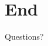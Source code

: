 \documentclass{beamer}
\begin{document}
\section{End}

\begin{frame}
  \vspace*{36 pt}
  \begin{center}
  {\Huge Questions?}
  \end{center}
\end{frame}

%   
%   
\end{document}
